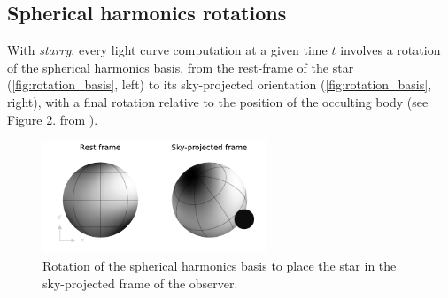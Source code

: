 \documentclass[modern]{aastex631}
\begin{document}
\subsection{Spherical harmonics rotations}


With \textit{starry}, every light curve computation at a given time $t$ involves a rotation of the spherical harmonics basis, from the rest-frame of the star (\autoref{fig:rotation_basis}, left) to its sky-projected orientation (\autoref{fig:rotation_basis}, right), with a final rotation relative to the position of the occulting body (see Figure 2. from \citealt{starry}).
\begin{figure}[H]
    \begin{center}
        \includegraphics[width=0.6\textwidth]{../workflows/rotations/figures/rotation_basis.pdf}
        \caption{Rotation of the spherical harmonics basis to place the star in the sky-projected frame of the observer.}
        \label{fig:rotation_basis}
    \end{center}
\end{figure}
\end{document}
